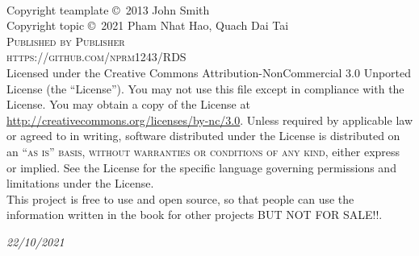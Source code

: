 \documentclass[11pt,fleqn]{book} %
\begin{document}




\newpage
~\vfill
\thispagestyle{empty}

\noindent Copyright teamplate \copyright\ 2013 John Smith\\ %
\noindent Copyright topic \copyright\ 2021 Pham Nhat Hao, Quach Dai Tai \\ %
\noindent \textsc{Published by Publisher}\\ %

\noindent \textsc{https://github.com/nprm1243/RDS}\\ %

\noindent Licensed under the Creative Commons Attribution-NonCommercial 3.0 Unported License (the ``License''). You may not use this file except in compliance with the License. You may obtain a copy of the License at \url{http://creativecommons.org/licenses/by-nc/3.0}. Unless required by applicable law or agreed to in writing, software distributed under the License is distributed on an \textsc{``as is'' basis, without warranties or conditions of any kind}, either express or implied. See the License for the specific language governing permissions and limitations under the License.\\ %

\noindent This project is free to use and open source, so that people can use the information written in the book for other projects BUT NOT FOR SALE!!.

\noindent \textit{22/10/2021} %



\end{document}
